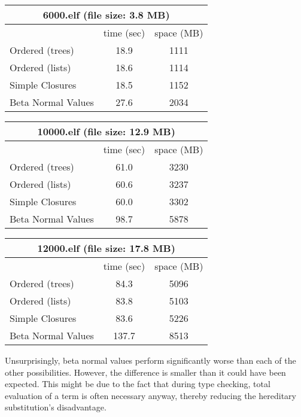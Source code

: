 \documentclass[submission,copyright,creativecommons]{eptcs}
\begin{document}
\begin{center}
\begin{tabular}{| l || c | c |}
\multicolumn{3}{c}{\textsf{6000.elf} (file size: 3.8 MB)}\\
\hline
& time (sec) & space (MB) \\
\hline
\hline
Ordered (trees) & 18.9 & 1111 \\
\hline
Ordered (lists) & 18.6 & 1114\\
\hline
Simple Closures & 18.5 & 1152\\
\hline
Beta Normal Values & 27.6 & 2034\\
\hline
\end{tabular}

\vspace{5pt}

\begin{tabular}{| l || c | c |}
\multicolumn{3}{c}{\textsf{10000.elf} (file size: 12.9 MB)}\\
\hline
& time (sec) & space (MB) \\
\hline
\hline
Ordered (trees) & 61.0 & 3230\\
\hline
Ordered (lists) & 60.6 & 3237\\
\hline
Simple Closures & 60.0 & 3302\\
\hline
Beta Normal Values & 98.7 & 5878\\
\hline
\end{tabular}

\vspace{5pt}

\begin{tabular}{| l || c | c |}
\multicolumn{3}{c}{\textsf{12000.elf} (file size: 17.8 MB)}\\
\hline
& time (sec) & space (MB) \\
\hline
\hline
Ordered (trees) & 84.3 & 5096 \\
\hline
Ordered (lists) & 83.8 & 5103 \\
\hline
Simple Closures & 83.6 & 5226 \\
\hline
Beta Normal Values & 137.7 & 8513 \\
\hline
\end{tabular}
\end{center}

Unsurprisingly, beta normal values perform significantly worse than each of the other possibilities. However, the difference is smaller than it could have been expected. This might be due to the fact that during type checking, total evaluation of a term is often necessary anyway, thereby reducing the hereditary substitution's disadvantage. 
\end{document}
